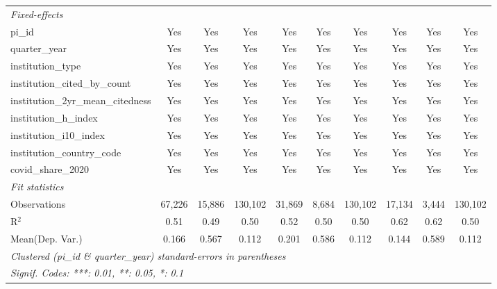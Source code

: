 \begin{tabular}{lccccccccc}
   \midrule
   \emph{Fixed-effects}\\
   pi\_id                                                      & Yes           & Yes           & Yes           & Yes           & Yes            & Yes           & Yes           & Yes           & Yes\\  
   quarter\_year                                               & Yes           & Yes           & Yes           & Yes           & Yes            & Yes           & Yes           & Yes           & Yes\\  
   institution\_type                                           & Yes           & Yes           & Yes           & Yes           & Yes            & Yes           & Yes           & Yes           & Yes\\  
   institution\_cited\_by\_count                               & Yes           & Yes           & Yes           & Yes           & Yes            & Yes           & Yes           & Yes           & Yes\\  
   institution\_2yr\_mean\_citedness                           & Yes           & Yes           & Yes           & Yes           & Yes            & Yes           & Yes           & Yes           & Yes\\  
   institution\_h\_index                                       & Yes           & Yes           & Yes           & Yes           & Yes            & Yes           & Yes           & Yes           & Yes\\  
   institution\_i10\_index                                     & Yes           & Yes           & Yes           & Yes           & Yes            & Yes           & Yes           & Yes           & Yes\\  
   institution\_country\_code                                  & Yes           & Yes           & Yes           & Yes           & Yes            & Yes           & Yes           & Yes           & Yes\\  
   covid\_share\_2020                                          & Yes           & Yes           & Yes           & Yes           & Yes            & Yes           & Yes           & Yes           & Yes\\  
   \midrule
   \emph{Fit statistics}\\
   Observations                                                & 67,226        & 15,886        & 130,102       & 31,869        & 8,684          & 130,102       & 17,134        & 3,444         & 130,102\\  
   R$^2$                                                       & 0.51          & 0.49          & 0.50          & 0.52          & 0.50           & 0.50          & 0.62          & 0.62          & 0.50\\  
Mean(Dep. Var.) & 0.166 & 0.567 & 0.112 & 0.201 & 0.586 & 0.112 & 0.144 & 0.589 & 0.112 \\
   \midrule \midrule
   \multicolumn{10}{l}{\emph{Clustered (pi\_id \& quarter\_year) standard-errors in parentheses}}\\
   \multicolumn{10}{l}{\emph{Signif. Codes: ***: 0.01, **: 0.05, *: 0.1}}\\
\end{tabular}
\par\endgroup
